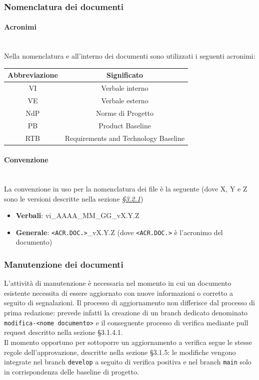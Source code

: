 \documentclass[10pt, letterpaper]{article}
\newcommand{\trisubsection}[1]{\paragraph{#1}\mbox{}\\}
\begin{document}
\subsubsection{Nomenclatura dei documenti}
\trisubsection{Acronimi}
Nella nomenclatura e all'interno dei documenti sono utilizzati i seguenti acronimi:

\begin{center}
    \begin{tabular}{|c|c|}
        \hline
        \rowcolor{lightgray} \textbf{Abbreviazione} & \textbf{Significato}                 \\
        \hline
        VI                                          & Verbale interno                      \\
        \hline
        VE                                          & Verbale esterno                      \\
        \hline
        NdP                                         & Norme di Progetto                    \\
        \hline
        PB                                          & Product Baseline                     \\
        \hline
        RTB                                         & Requirements and Technology Baseline \\
        \hline
    \end{tabular}
\end{center}

\trisubsection{Convenzione}
La convenzione in uso per la nomenclatura dei file è la seguente (dove X, Y e Z sono le versioni descritte nella sezione \hyperref[sec:Versionamento]{\textit{§3.2.1}})
\begin{itemize}
    \item \textbf{Verbali}: vi\_AAAA\_MM\_GG\_vX.Y.Z
    \item \textbf{Generale}: \texttt{<ACR.DOC.>}\_vX.Y.Z (dove \texttt{<ACR.DOC.>} è l'acronimo del documento)
\end{itemize}

\subsubsection{Manutenzione dei documenti}
L'attività di manutenzione è necessaria nel momento in cui un documento 
esistente necessita di essere aggiornato con nuove informazioni o corretto 
a seguito di segnalazioni. Il processo di aggiornamento non differisce dal 
processo di prima redazione: prevede infatti la creazione di un branch 
dedicato denominato \texttt{modifica-<nome documento>} e il conseguente 
processo di verifica mediante pull request descritto nella sezione §3.1.4.1.
\noindent
\\
Il momento opportuno per sottoporre un aggiornamento a verifica segue 
le stesse regole dell'approvazione, descritte nella sezione §3.1.5: 
le modifiche vengono integrate nel branch \texttt{develop} a seguito 
di verifica positiva e nel branch \texttt{main} solo in corrispondenza 
delle baseline di progetto.
\end{document}
